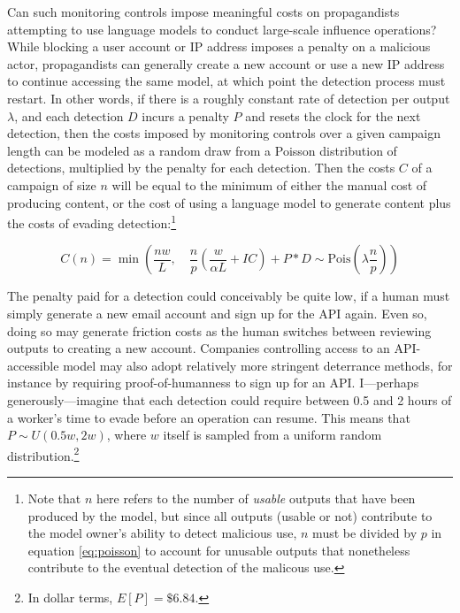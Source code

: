 \documentclass{article}
\begin{document}
Can such monitoring controls impose meaningful costs on propagandists attempting to use language models to conduct large-scale influence operations? While blocking a user account or IP address imposes a penalty on a malicious actor, propagandists can generally create a new account or use a new IP address to continue accessing the same model, at which point the detection process must restart. In other words, if there is a roughly constant rate of detection per output $\lambda$, and each detection $D$ incurs a penalty $P$ and resets the clock for the next detection, then the costs imposed by monitoring controls over a given campaign length can be modeled as a random draw from a Poisson distribution of detections, multiplied by the penalty for each detection. Then the costs $C$ of a campaign of size $n$ will be equal to the minimum of either the manual cost of producing content, or the cost of using a language model to generate content plus the costs of evading detection:\footnote{Note that $n$ here refers to the number of \textit{usable} outputs that have been produced by the model, but since all outputs (usable or not) contribute to the model owner's ability to detect malicious use, $n$ must be divided by $p$ in equation \ref{eq:poisson} to account for unusable outputs that nonetheless contribute to the eventual detection of the malicous use.}

\begin{equation}
  C(n) = \min \left( \frac{nw}{L}, \quad \frac{n}{p} \left( \frac{w}{\alpha L} + IC \right) + P * D \sim \text{Pois}\left( \lambda \frac{n}{p} \right) \right)
  \label{eq:poisson}
\end{equation}

The penalty paid for a detection could conceivably be quite low, if a human must simply generate a new email account and sign up for the API again. Even so, doing so may generate friction costs as the human switches between reviewing outputs to creating a new account. Companies controlling access to an API-accessible model may also adopt relatively more stringent deterrance methods, for instance by requiring proof-of-humanness to sign up for an API. I—perhaps generously—imagine that each detection could require between 0.5 and 2 hours of a worker's time to evade before an operation can resume. This means that $P \sim U(0.5w, 2w)$, where $w$ itself is sampled from a uniform random distribution.\footnote{In dollar terms, $E[P] = \$6.84$.} 
\end{document}

